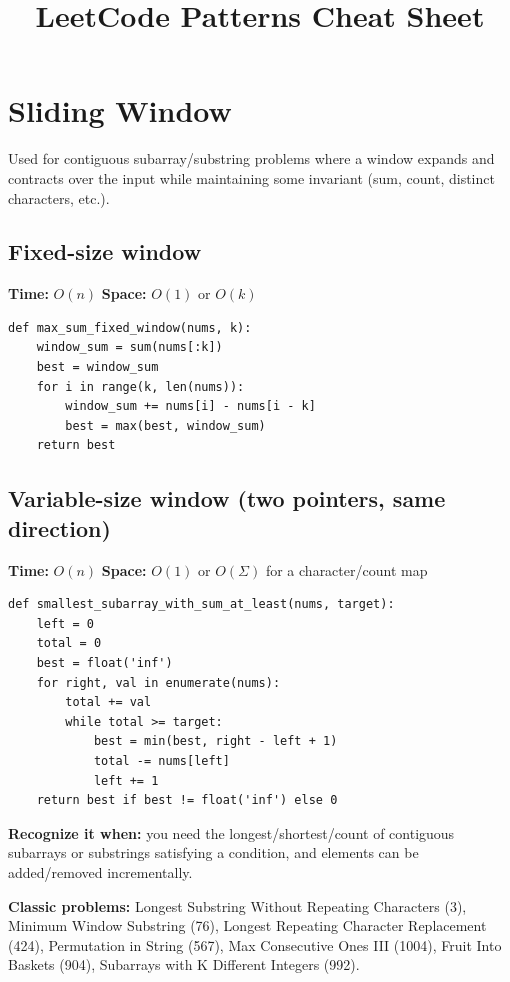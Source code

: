 \documentclass[11pt]{article}
\title{LeetCode Patterns Cheat Sheet}
\author{}
\date{}
\newcommand{\complexity}[2]{\textbf{Time:} #1 \quad \textbf{Space:} #2}
\begin{document}
\maketitle
\tableofcontents

\section{Sliding Window}

Used for contiguous subarray/substring problems where a window expands and
contracts over the input while maintaining some invariant (sum, count,
distinct characters, etc.).

\subsection{Fixed-size window}
\complexity{$O(n)$}{$O(1)$ or $O(k)$}

\begin{lstlisting}
def max_sum_fixed_window(nums, k):
    window_sum = sum(nums[:k])
    best = window_sum
    for i in range(k, len(nums)):
        window_sum += nums[i] - nums[i - k]
        best = max(best, window_sum)
    return best
\end{lstlisting}

\subsection{Variable-size window (two pointers, same direction)}
\complexity{$O(n)$}{$O(1)$ or $O(\Sigma)$ for a character/count map}

\begin{lstlisting}
def smallest_subarray_with_sum_at_least(nums, target):
    left = 0
    total = 0
    best = float('inf')
    for right, val in enumerate(nums):
        total += val
        while total >= target:
            best = min(best, right - left + 1)
            total -= nums[left]
            left += 1
    return best if best != float('inf') else 0
\end{lstlisting}

\textbf{Recognize it when:} you need the longest/shortest/count of
contiguous subarrays or substrings satisfying a condition, and elements can
be added/removed incrementally.

\textbf{Classic problems:} Longest Substring Without Repeating Characters
(3), Minimum Window Substring (76), Longest Repeating Character
Replacement (424), Permutation in String (567), Max Consecutive Ones III
(1004), Fruit Into Baskets (904), Subarrays with K Different Integers
(992).
\end{document}
